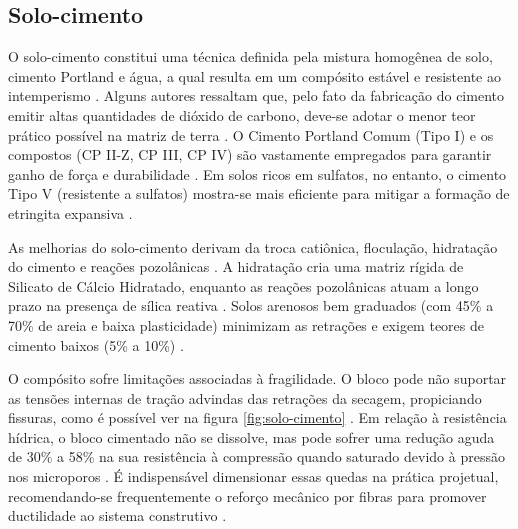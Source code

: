 \subsection{Solo-cimento}


O solo-cimento constitui uma técnica definida pela mistura homogênea de solo, cimento Portland e água, a qual resulta em um compósito estável e resistente ao intemperismo  \cite{Barroso2019,Silva2019}. Alguns autores ressaltam que, pelo fato da fabricação do cimento emitir altas quantidades de dióxido de carbono, deve-se adotar o menor teor prático possível na matriz de terra \cite{Firoozi2017,MoraRuiz2025,Fernandes2019}. O Cimento Portland Comum (Tipo I) e os compostos (CP II-Z, CP III, CP IV) são vastamente empregados para garantir ganho de força e durabilidade \cite{Barroso2019}. Em solos ricos em sulfatos, no entanto, o cimento Tipo V (resistente a sulfatos) mostra-se mais eficiente para mitigar a formação de etringita expansiva  \cite{Barman2022,Mahedi2018}.

As melhorias do solo-cimento derivam da troca catiônica, floculação, hidratação do cimento e reações pozolânicas \cite{Ding2021, Barman2022, Jalal2020}. A hidratação cria uma matriz rígida de Silicato de Cálcio Hidratado, enquanto as reações pozolânicas atuam a longo prazo na presença de sílica reativa \cite{Ding2021,Galvao2004,Dao2018}. Solos arenosos bem graduados (com 45\% a 70\% de areia e baixa plasticidade) minimizam as retrações e exigem teores de cimento baixos (5\% a 10\%) \cite{Barroso2019,Silva2019}.

O compósito sofre limitações associadas à fragilidade. O bloco pode não suportar as tensões internas de tração advindas das retrações da secagem, propiciando fissuras, como é possível ver na figura \ref{fig:solo-cimento} \cite{Barroso2019, Firoozi2017}. Em relação à resistência hídrica, o bloco cimentado não se dissolve, mas pode sofrer uma redução aguda de 30\% a 58\% na sua resistência à compressão quando saturado devido à pressão nos microporos \cite{Junior2021,Barroso2023,Silva2019}. É indispensável dimensionar essas quedas na prática projetual, recomendando-se frequentemente o reforço mecânico por fibras para promover ductilidade ao sistema construtivo \cite{Barroso2023,Junior2021,Soler2021}.

